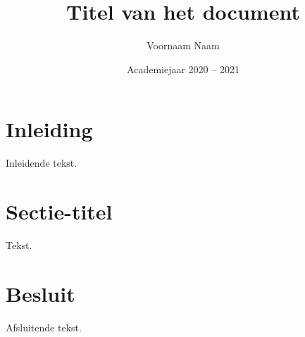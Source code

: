 \documentclass[kulak]{kulakarticle} %
\title{Titel van het document}
\author{Voornaam Naam}
\date{Academiejaar 2020 -- 2021}
\begin{document}
\maketitle

\section*{Inleiding}

Inleidende tekst.

\section{Sectie-titel}

Tekst.

\section*{Besluit}

Afsluitende tekst.
\end{document}
